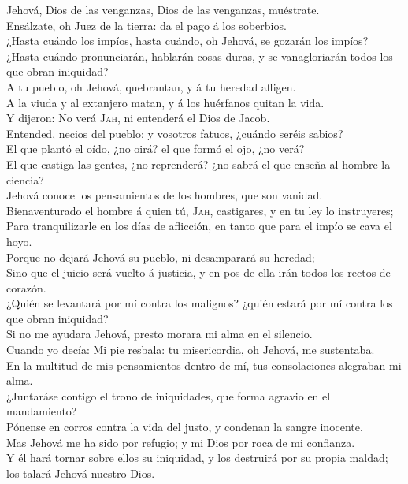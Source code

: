  Jehová, Dios de las venganzas, Dios de las venganzas,
muéstrate.\\
 Ensálzate, oh Juez de la tierra: da el pago á los
soberbios.\\
 ¿Hasta cuándo los impíos, hasta cuándo, oh Jehová, se
gozarán los impíos?\\
 ¿Hasta cuándo pronunciarán, hablarán cosas duras, y se
vanagloriarán todos los que obran iniquidad?\\
 A tu pueblo, oh Jehová, quebrantan, y á tu heredad
afligen.\\
 A la viuda y al extanjero matan, y á los huérfanos quitan
la vida.\\
 Y dijeron: No verá \textsc{Jah}, ni entenderá el Dios de
Jacob.\\
 Entended, necios del pueblo; y vosotros fatuos, ¿cuándo
seréis sabios?\\
 El que plantó el oído, ¿no oirá? el que formó el ojo, ¿no
verá?\\
 El que castiga las gentes, ¿no reprenderá? ¿no sabrá el
que enseña al hombre la ciencia?\\
 Jehová conoce los pensamientos de los hombres, que son
vanidad.\\
 Bienaventurado el hombre á quien tú, \textsc{Jah},
castigares, y en tu ley lo instruyeres;\\
 Para tranquilizarle en los días de aflicción, en tanto
que para el impío se cava el hoyo.\\
 Porque no dejará Jehová su pueblo, ni desamparará su
heredad;\\
 Sino que el juicio será vuelto á justicia, y en pos de
ella irán todos los rectos de corazón.\\
 ¿Quién se levantará por mí contra los malignos? ¿quién
estará por mí contra los que obran iniquidad?\\
 Si no me ayudara Jehová, presto morara mi alma en el
silencio.\\
 Cuando yo decía: Mi pie resbala: tu misericordia, oh
Jehová, me sustentaba.\\
 En la multitud de mis pensamientos dentro de mí, tus
consolaciones alegraban mi alma.\\
 ¿Juntaráse contigo el trono de iniquidades, que forma
agravio en el mandamiento?\\
 Pónense en corros contra la vida del justo, y condenan
la sangre inocente.\\
 Mas Jehová me ha sido por refugio; y mi Dios por roca de
mi confianza.\\
 Y él hará tornar sobre ellos su iniquidad, y los
destruirá por su propia maldad; los talará Jehová nuestro Dios.

